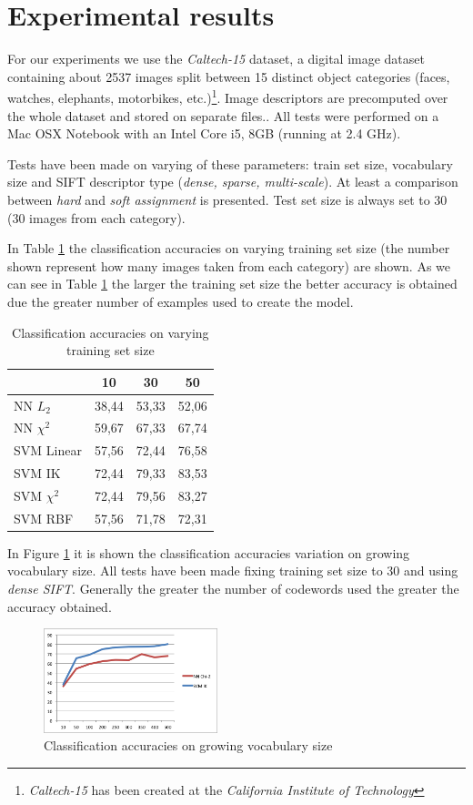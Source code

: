 \section{Experimental results}

For our experiments we use the \emph{Caltech-15} dataset, a digital image dataset containing about 2537 images  split between 15 distinct object categories (faces, watches, elephants, motorbikes, etc.)\footnote{\emph{Caltech-15} has been created at the \emph{California Institute of Technology}}. Image descriptors are precomputed over the whole dataset and stored on separate files.. All tests were performed on a Mac OSX Notebook with an Intel Core i5, 8GB (running at 2.4 GHz).

Tests have been made on varying of these parameters: train set size, vocabulary size and SIFT descriptor type (\emph{dense, sparse, multi-scale}). At least a comparison between \emph{hard} and \emph{soft assignment} is presented. Test set size is always set to 30 (30 images from each category).

In Table \ref{tab:trainsetsize} the classification accuracies on varying training set size (the number shown represent how many images taken from each category) are shown. As we can see in Table \ref{tab:trainsetsize} the larger the training set size the better accuracy is obtained due the greater number of examples used to create the model.

\begin{table}[h]
\begin{center}
\begin{tabular}{|l|c|c|c|}
\hline
 & 10 & 30 & 50\\
\hline\hline
NN $L_2$ & 38,44 & 53,33 & 52,06\\
NN $\chi^2$ & 59,67 & 67,33 & 67,74\\
SVM Linear & 57,56 & 72,44 & 76,58\\
SVM IK & 72,44 & 79,33 & 83,53\\
SVM $\chi^2$ & 72,44 & 79,56 & 83,27\\
SVM RBF & 57,56 & 71,78 & 72,31 \\
\hline
\end{tabular}
\end{center}
\label{tab:trainsetsize}
\caption{Classification accuracies on varying training set size}
\end{table}

In Figure \ref{fig:vocabulary} it is shown the classification accuracies variation on growing vocabulary size. All tests have been made fixing training set size to 30 and using \emph{dense SIFT}. Generally the greater the number of codewords used the greater the accuracy obtained.

\begin{figure}[h]
\begin{center}
\includegraphics[width=0.45\textwidth]{images/vocabulary.png}
\end{center}
  \caption{Classification accuracies on growing vocabulary size}
\label{fig:vocabulary}
\end{figure}


